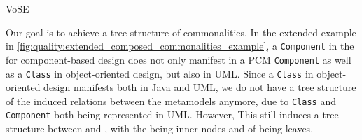 \begin{copiedFrom}{VoSE}

%     

Our goal is to achieve a tree structure of commonalities. In the extended example in \autoref{fig:quality:extended_composed_commonalities_example}, a \texttt{Component} in the \conceptmetamodel for component-based design does not only manifest in a \gls{PCM} \texttt{Component} as well as a \texttt{Class} in object-oriented design, but also in \gls{UML}.
Since a \texttt{Class} in object-oriented design manifests both in Java and \gls{UML}, we do not have a tree structure of the induced relations between the metamodels anymore, due to \texttt{Class} and \texttt{Component} both being represented in \gls{UML}.
However, This still induces a tree structure between \metaclasses and \commonalities, with the \commonalities being inner nodes and \metaclasses of \concretemetamodels being leaves.


\end{copiedFrom}
